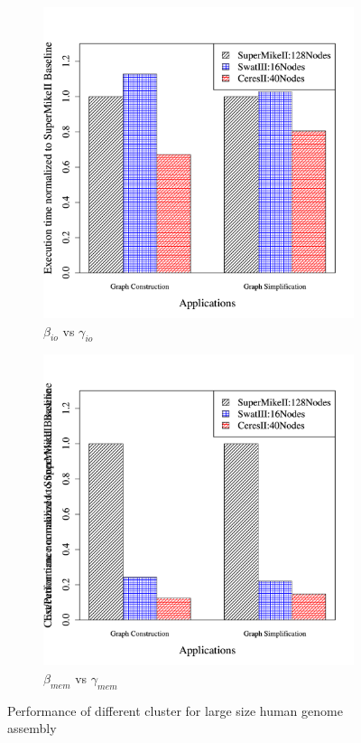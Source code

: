 \documentclass[journal]{IEEEtran}
\begin{document}
\begin{figure}[htb]
	\begin{subfigure}[b]{0.23\textwidth}
                \includegraphics[width=\textwidth]{Figures/PerformanceFigures/execTimeHum.pdf}
                \caption{$\beta_{io}$ vs  $\gamma_{io}$}
                \label{fig:HumPerf}
    \end{subfigure}
 	\begin{subfigure}[b]{0.23\textwidth}
                \includegraphics[width=\textwidth]{Figures/PerformanceFigures/costTimeHum.pdf}
                \caption{$\beta_{mem}$ vs  $\gamma_{mem}$}
                \label{fig:HumCost}
   \end{subfigure}
   \caption{Performance of different cluster for large size human genome assembly}
  \label{fig:Hum}
\end{figure}
\end{document}
